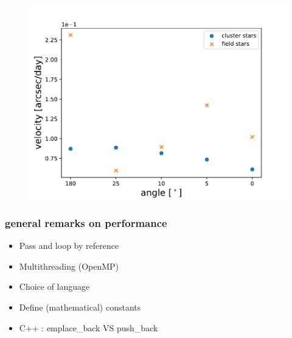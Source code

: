 \documentclass{beamer}
\begin{document}
\begin{frame}
\begin{figure}
\centering
\includegraphics[width=\textwidth,height=\textheight,keepaspectratio]{Images/25_avg_vel_640.pdf}
\end{figure}
\end{frame}

\begin{frame}
\frametitle{general remarks on performance}
\begin{itemize}
\item Pass and loop by reference
\item Multithreading (OpenMP)
\item Choice of language
\item Define (mathematical) constants
\item C++ : emplace\_back VS push\_back
\end{itemize}

\end{frame}
\end{document}
